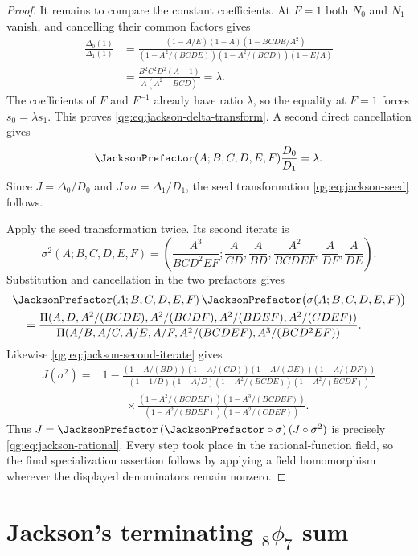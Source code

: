\begin{proof}
It remains to compare the constant coefficients.  At $F=1$ both $N_0$ and
$N_1$ vanish, and cancelling their common factors gives
\begin{align*}
\frac{\Delta_0(1)}{\Delta_1(1)}
&=\frac{(1-A/E)(1-A)(1-BCDE/A^2)}
{(1-A^2/(BCDE))(1-A^2/(BCD))(1-E/A)}\\
&=\frac{B^2C^2D^2(A-1)}{A(A^2-BCD)}
=\lambda.
\end{align*}
The coefficients of $F$ and $F^{-1}$ already have ratio $\lambda$, so the
equality at $F=1$ forces $s_0=\lambda s_1$.  This proves
\eqref{qg:eq:jackson-delta-transform}.  A second direct cancellation gives
\[
 \JacksonPrefactor(A;B,C,D,E,F)\frac{D_0}{D_1}=\lambda.
\]
Since $J=\Delta_0/D_0$ and
$J\circ\sigma=\Delta_1/D_1$, the seed transformation
\eqref{qg:eq:jackson-seed} follows.

Apply the seed transformation twice.  Its second iterate is
\begin{equation}
\label{qg:eq:jackson-second-iterate}
\sigma^2(A;B,C,D,E,F)
=\left(
 \frac{A^3}{BCD^2EF};
 \frac{A}{CD},\frac{A}{BD},\frac{A^2}{BCDEF},
 \frac{A}{DF},\frac{A}{DE}
\right).
\end{equation}
Substitution and cancellation in the two prefactors gives
\begin{align*}
&\JacksonPrefactor(A;B,C,D,E,F)\,
 \JacksonPrefactor\bigl(\sigma(A;B,C,D,E,F)\bigr)\\
&\quad=
\frac{\Pi(A,D,A^2/(BCDE),A^2/(BCDF),
 A^2/(BDEF),A^2/(CDEF))}
{\Pi(A/B,A/C,A/E,A/F,A^2/(BCDEF),A^3/(BCD^2EF))}.
\end{align*}
Likewise \eqref{qg:eq:jackson-second-iterate} gives
\begin{align*}
J(\sigma^2)
={}&1-
 \frac{(1-A/(BD))(1-A/(CD))(1-A/(DE))(1-A/(DF))}
 {(1-1/D)(1-A/D)(1-A^2/(BCDE))(1-A^2/(BCDF))}\\
&\qquad\times
 \frac{(1-A^2/(BCDEF))(1-A^3/(BCDEF))}
 {(1-A^2/(BDEF))(1-A^2/(CDEF))}.
\end{align*}
Thus
$J=\JacksonPrefactor\,(\JacksonPrefactor\circ\sigma)\,(J\circ\sigma^2)$
is precisely
\eqref{qg:eq:jackson-rational}.  Every step took place in the rational-function
field, so the final specialization assertion follows by applying a field
homomorphism wherever the displayed denominators remain nonzero.
\end{proof}

\section{Jackson's terminating \texorpdfstring{${}_8\phi_7$}{8phi7} sum}
\label{qg:sec:jackson-8phi7}

